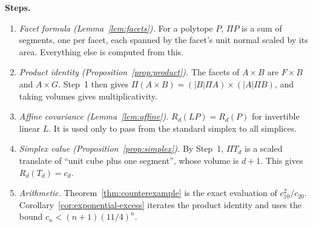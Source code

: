 \documentclass[11pt]{article}
\begin{document}
\textbf{Steps.}
\begin{enumerate}[leftmargin=2em,itemsep=2pt]
\item \emph{Facet formula (Lemma~\ref{lem:facets}).} For a polytope \(P\),
 \(\Pi P\) is a sum of segments, one per facet, each spanned by the facet's
 unit normal scaled by its area. Everything else is computed from this.
\item \emph{Product identity (Proposition~\ref{prop:product}).} The facets
 of \(A\times B\) are \(F\times B\) and \(A\times G\). Step~1 then gives
 \(\Pi(A\times B)=(|B|\Pi A)\times(|A|\Pi B)\), and taking volumes gives
 multiplicativity.
\item \emph{Affine covariance (Lemma~\ref{lem:affine}).}
 \(R_d(LP)=R_d(P)\) for invertible linear \(L\). It is used only to pass
 from the standard simplex to all simplices.
\item \emph{Simplex value (Proposition~\ref{prop:simplex}).} By Step~1,
 \(\Pi T_d\) is a scaled translate of ``unit cube plus one segment'', whose
 volume is \(d+1\). This gives \(R_d(T_d)=c_d\).
\item \emph{Arithmetic.} Theorem~\ref{thm:counterexample} is the exact
 evaluation of \(c_{10}^2/c_{20}\).
 Corollary~\ref{cor:exponential-excess} iterates the product identity and
 uses the bound \(c_n<(n+1)(11/4)^n\).
\end{enumerate}

\begin{center}
\end{center}
\end{document}
